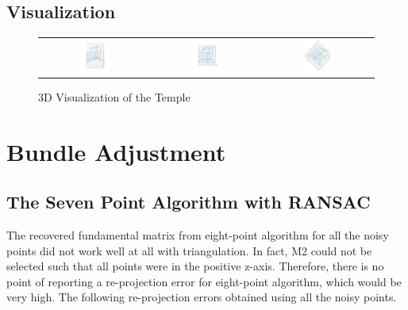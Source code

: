 \documentclass[a4paper]{article}
\begin{document}
\subsection{Visualization}
\begin{figure}[!ht]
\centering
\begin{tabular}{ccc}
{\includegraphics[width=0.3\textwidth]{images/temple1.png}} &
{\includegraphics[width=0.3\textwidth]{images/temple2.png}} &
{\includegraphics[width=0.3\textwidth]{images/temple3.png}}
\end{tabular}
\caption{3D Visualization of the Temple}
\end{figure}

\section{Bundle Adjustment}
\subsection{The Seven Point Algorithm with RANSAC}
The recovered fundamental matrix from eight-point algorithm for all the noisy points did not work well at all with triangulation. In fact, M2 could not be selected such that all points were in the positive z-axis. Therefore, there is no point of reporting a re-projection error for eight-point algorithm, which would be very high. The following re-projection errors obtained using all the noisy points.
\clearpage
\end{document}

